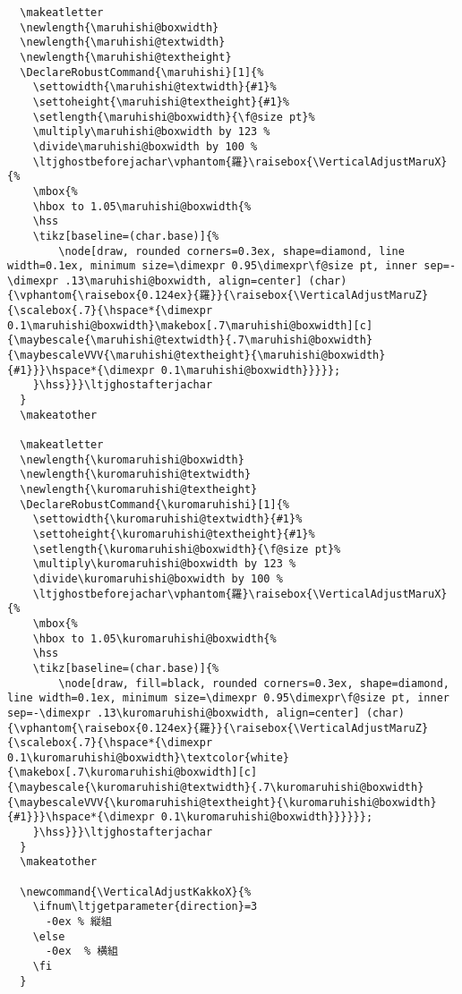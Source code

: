 \documentclass[luatex,fontsize=10pt,paper=b5,twoside]{jlreq}%
\begin{document}
\begin{lstlisting}
  \makeatletter
  \newlength{\maruhishi@boxwidth}
  \newlength{\maruhishi@textwidth}
  \newlength{\maruhishi@textheight}
  \DeclareRobustCommand{\maruhishi}[1]{%
    \settowidth{\maruhishi@textwidth}{#1}%
    \settoheight{\maruhishi@textheight}{#1}%
    \setlength{\maruhishi@boxwidth}{\f@size pt}%
    \multiply\maruhishi@boxwidth by 123 %
    \divide\maruhishi@boxwidth by 100 %
    \ltjghostbeforejachar\vphantom{羅}\raisebox{\VerticalAdjustMaruX}{%
    \mbox{%
    \hbox to 1.05\maruhishi@boxwidth{%
    \hss
    \tikz[baseline=(char.base)]{%
        \node[draw, rounded corners=0.3ex, shape=diamond, line width=0.1ex, minimum size=\dimexpr 0.95\dimexpr\f@size pt, inner sep=-\dimexpr .13\maruhishi@boxwidth, align=center] (char) {\vphantom{\raisebox{0.124ex}{羅}}{\raisebox{\VerticalAdjustMaruZ}{\scalebox{.7}{\hspace*{\dimexpr 0.1\maruhishi@boxwidth}\makebox[.7\maruhishi@boxwidth][c]{\maybescale{\maruhishi@textwidth}{.7\maruhishi@boxwidth}{\maybescaleVVV{\maruhishi@textheight}{\maruhishi@boxwidth}{#1}}}\hspace*{\dimexpr 0.1\maruhishi@boxwidth}}}}};
    }\hss}}}\ltjghostafterjachar
  }
  \makeatother

  \makeatletter
  \newlength{\kuromaruhishi@boxwidth}
  \newlength{\kuromaruhishi@textwidth}
  \newlength{\kuromaruhishi@textheight}
  \DeclareRobustCommand{\kuromaruhishi}[1]{%
    \settowidth{\kuromaruhishi@textwidth}{#1}%
    \settoheight{\kuromaruhishi@textheight}{#1}%
    \setlength{\kuromaruhishi@boxwidth}{\f@size pt}%
    \multiply\kuromaruhishi@boxwidth by 123 %
    \divide\kuromaruhishi@boxwidth by 100 %
    \ltjghostbeforejachar\vphantom{羅}\raisebox{\VerticalAdjustMaruX}{%
    \mbox{%
    \hbox to 1.05\kuromaruhishi@boxwidth{%
    \hss
    \tikz[baseline=(char.base)]{%
        \node[draw, fill=black, rounded corners=0.3ex, shape=diamond, line width=0.1ex, minimum size=\dimexpr 0.95\dimexpr\f@size pt, inner sep=-\dimexpr .13\kuromaruhishi@boxwidth, align=center] (char) {\vphantom{\raisebox{0.124ex}{羅}}{\raisebox{\VerticalAdjustMaruZ}{\scalebox{.7}{\hspace*{\dimexpr 0.1\kuromaruhishi@boxwidth}\textcolor{white}{\makebox[.7\kuromaruhishi@boxwidth][c]{\maybescale{\kuromaruhishi@textwidth}{.7\kuromaruhishi@boxwidth}{\maybescaleVVV{\kuromaruhishi@textheight}{\kuromaruhishi@boxwidth}{#1}}}\hspace*{\dimexpr 0.1\kuromaruhishi@boxwidth}}}}}};
    }\hss}}}\ltjghostafterjachar
  }
  \makeatother

  \newcommand{\VerticalAdjustKakkoX}{%
    \ifnum\ltjgetparameter{direction}=3
      -0ex % 縦組
    \else
      -0ex  % 横組
    \fi
  }


\end{lstlisting}
\end{document}
